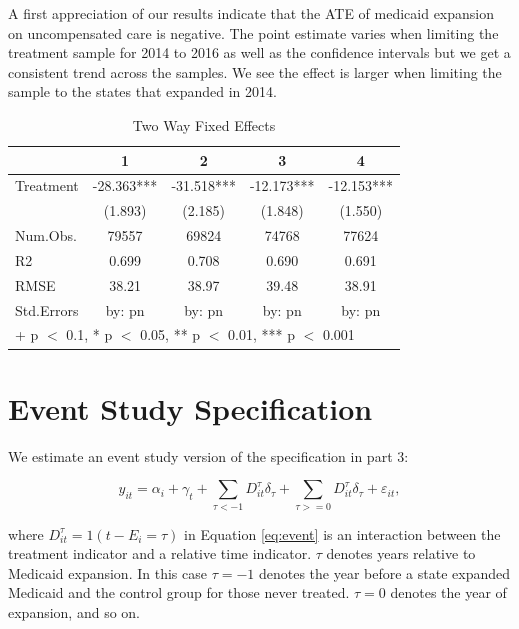 \documentclass[
  12pt,
]{article}
\begin{document}
A first appreciation of our results indicate that the ATE of medicaid
expansion on uncompensated care is negative. The point estimate varies
when limiting the treatment sample for 2014 to 2016 as well as the
confidence intervals but we get a consistent trend across the samples.
We see the effect is larger when limiting the sample to the states that
expanded in 2014.

\begin{table}

\caption{\label{tab:Tab-2}Two Way Fixed Effects}
\centering
\begin{tabular}[t]{lcccc}
\toprule
  & 1 & 2 & 3 & 4\\
\midrule
Treatment & -28.363*** & -31.518*** & -12.173*** & -12.153***\\
 & (1.893) & (2.185) & (1.848) & (1.550)\\
\midrule
Num.Obs. & 79557 & 69824 & 74768 & 77624\\
R2 & 0.699 & 0.708 & 0.690 & 0.691\\
RMSE & 38.21 & 38.97 & 39.48 & 38.91\\
Std.Errors & by: pn & by: pn & by: pn & by: pn\\
\bottomrule
\multicolumn{5}{l}{\rule{0pt}{1em}+ p $<$ 0.1, * p $<$ 0.05, ** p $<$ 0.01, *** p $<$ 0.001}\\
\end{tabular}
\end{table}

\newpage

\hypertarget{event-study-specification}{%
\section{Event Study Specification}\label{event-study-specification}}

We estimate an event study version of the specification in part 3:

\begin{equation}
\label{eq:event}
y_{it} = \alpha_{i} + \gamma_{t} +\sum_{\tau < -1} D_{it}^{\tau} \delta_{\tau} + \sum_{\tau>=0} D_{it}^{\tau} \delta_{\tau} + \varepsilon_{it},
\end{equation}

where \(D_{it}^{\tau} = 1(t-E_{i}=\tau)\) in Equation \ref{eq:event} is
an interaction between the treatment indicator and a relative time
indicator. \(\tau\) denotes years relative to Medicaid expansion. In
this case \(\tau=-1\) denotes the year before a state expanded Medicaid
and the control group for those never treated. \(\tau=0\) denotes the
year of expansion, and so on.
\end{document}
